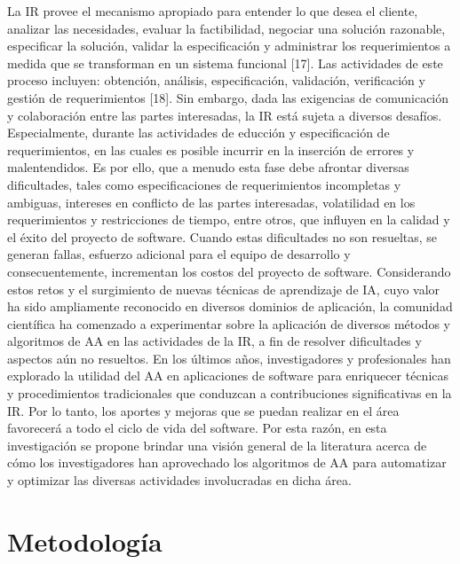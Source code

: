 \documentclass[journal]{IEEEtran}
\begin{document}
La IR provee el mecanismo apropiado para entender lo que desea el cliente, analizar las necesidades, evaluar la factibilidad, negociar una solución razonable, especificar la solución, validar la especificación y administrar los requerimientos a medida que se transforman en un sistema funcional \cite{thayer1997software}[17]. Las actividades de este proceso incluyen: obtención, análisis, especificación, validación, verificación y gestión de requerimientos \cite{Pohl2010}[18].
Sin embargo, dada las exigencias de comunicación y colaboración entre las partes interesadas, la IR está sujeta a diversos desafíos. Especialmente, durante las actividades de educción y especificación de requerimientos, en las cuales es posible incurrir en la inserción de errores y malentendidos. Es por ello, que a menudo esta fase debe afrontar diversas dificultades, tales como especificaciones de requerimientos incompletas y ambiguas, intereses en conflicto de las partes interesadas, volatilidad en los requerimientos y restricciones de tiempo, entre otros, que influyen en la calidad y el éxito del proyecto de software. Cuando estas dificultades no son resueltas, se generan fallas, esfuerzo adicional para el equipo de desarrollo y consecuentemente, incrementan los costos del proyecto de software. 
Considerando estos retos y el surgimiento de nuevas técnicas de aprendizaje de IA, cuyo valor ha sido ampliamente reconocido en diversos dominios de aplicación, la comunidad científica ha comenzado a experimentar sobre la aplicación de diversos métodos y algoritmos de AA en las actividades de la IR, a fin de resolver dificultades y aspectos aún no resueltos. En los últimos años, investigadores y profesionales han explorado la utilidad del AA en aplicaciones de software para enriquecer técnicas y procedimientos tradicionales que conduzcan a contribuciones significativas en la IR. Por lo tanto, los aportes y mejoras que se puedan realizar en el área favorecerá a todo el ciclo de vida del software. Por esta razón, en esta investigación se propone brindar una visión general de la literatura acerca de cómo los investigadores han aprovechado los algoritmos de AA para automatizar y optimizar las diversas actividades involucradas en dicha área.



\section{Metodología}
\end{document}

